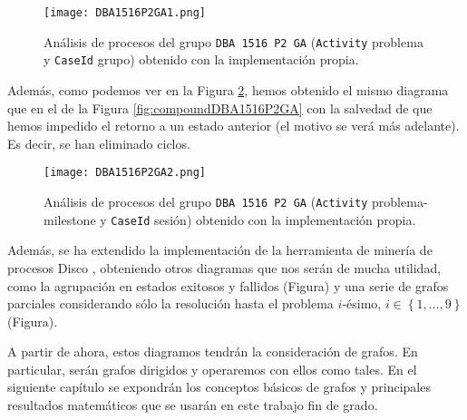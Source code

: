 \begin{figure}[H]
    \centering
    \texttt{[image: DBA1516P2GA1.png]}
    \caption{Análisis de procesos del grupo \texttt{DBA 1516 P2 GA} (\texttt{Activity} problema y \texttt{CaseId} grupo) obtenido con la implementación propia.}
    \label{fig:DBA1516P2GA1}
\end{figure}

Además, como podemos ver en la Figura \ref{fig:DBA1516P2GA2}, hemos obtenido el mismo diagrama que en el de la Figura \ref{fig:compoundDBA1516P2GA} con la salvedad de que hemos impedido el retorno a un estado anterior (el motivo se verá más adelante). Es decir, se han eliminado ciclos.

\begin{figure}[H]
    \centering
    \texttt{[image: DBA1516P2GA2.png]}
    \caption{Análisis de procesos del grupo \texttt{DBA 1516 P2 GA} (\texttt{Activity} problema-milestone y \texttt{CaseId} sesión) obtenido con la implementación propia.}
    \label{fig:DBA1516P2GA2}
\end{figure}

Además, se ha extendido la implementación de la herramienta de minería de procesos Disco \cite{gunther2012disco}, obteniendo otros diagramas que nos serán de mucha utilidad, como la agrupación en estados exitosos y fallidos (Figura) y una serie de grafos parciales considerando sólo la resolución hasta el problema $i$-ésimo, $i \in \left\lbrace 1,\dots,9 \right\rbrace$ (Figura).

A partir de ahora, estos diagramos tendrán la consideración de grafos. En particular, serán grafos dirigidos y operaremos con ellos como tales. En el siguiente capítulo se expondrán los conceptos básicos de grafos y principales resultados matemáticos que se usarán en este trabajo fin de grado.